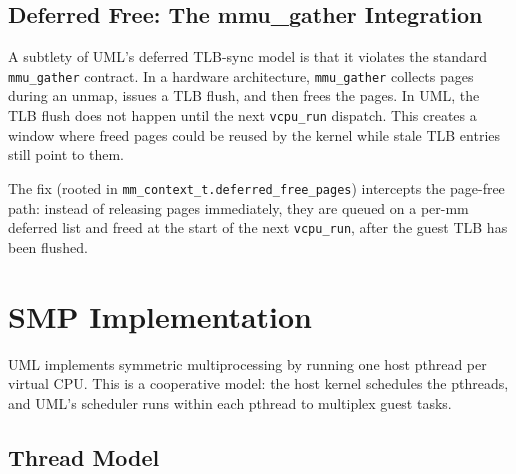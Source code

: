 \subsection{Deferred Free: The mmu\_gather Integration}

A subtlety of UML's deferred TLB-sync model is that it violates the standard
\texttt{mmu\_gather} contract.  In a hardware architecture, \texttt{mmu\_gather}
collects pages during an unmap, issues a TLB flush, and then frees the pages.
In UML, the TLB flush does not happen until the next \texttt{vcpu\_run}
dispatch.  This creates a window where freed pages could be reused by the
kernel while stale TLB entries still point to them.

The fix (rooted in \texttt{mm\_context\_t.deferred\_free\_pages}) intercepts
the page-free path: instead of releasing pages immediately, they are queued
on a per-mm deferred list and freed at the start of the next
\texttt{vcpu\_run}, after the guest TLB has been flushed.


\section{SMP Implementation}
\label{sec:smp}

UML implements symmetric multiprocessing by running one host pthread per
virtual CPU.  This is a cooperative model: the host kernel schedules the
pthreads, and UML's scheduler runs within each pthread to multiplex guest
tasks.

\subsection{Thread Model}


